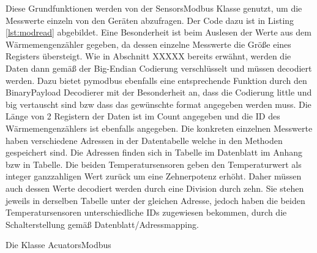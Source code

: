 

Diese Grundfunktionen werden von der SensorsModbus Klasse genutzt, um die Messwerte einzeln von den Geräten abzufragen. Der Code dazu ist in Listing \ref{lst:modread} abgebildet.
Eine Besonderheit ist beim Auslesen der Werte aus dem Wärmemengenzähler gegeben, da dessen einzelne Messwerte die Größe eines Registers übersteigt. Wie in Abschnitt XXXXX bereits erwähnt, werden die Daten dann gemäß der Big-Endian Codierung verschlüsselt und müssen decodiert werden. Dazu bietet pymodbus ebenfalls eine entsprechende Funktion durch den BinaryPayload Decodierer mit der Besonderheit an, dass die Codierung little und big vertauscht sind bzw dass das gewünschte format angegeben werden muss. Die Länge von 2 Registern der Daten ist im Count angegeben und die ID des Wärmemengenzählers ist ebenfalls angegeben. Die konkreten einzelnen Messwerte haben verschiedene Adressen in der Datentabelle welche in den Methoden gespeichert sind.
Die Adressen finden sich in Tabelle im Datenblatt im Anhang bzw in Tabelle.
Die beiden Temperatursensoren geben den Temperaturwert als integer ganzzahligen Wert zurück um eine Zehnerpotenz erhöht. Daher müssen auch dessen Werte decodiert werden durch eine Division durch zehn. Sie stehen jeweils in derselben Tabelle unter der gleichen Adresse, jedoch haben die beiden Temperatursensoren unterschiedliche IDs zugewiesen bekommen, durch die Schalterstellung gemäß Datenblatt/Adressmapping.



Die Klasse AcuatorsModbus


